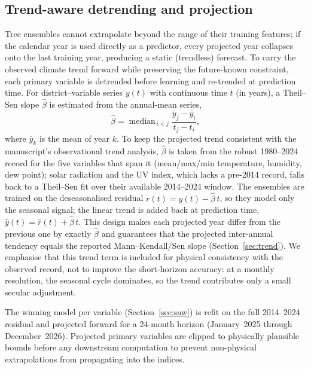 \documentclass[review,11pt]{elsarticle}
\begin{document}
\subsection{Trend-aware detrending and projection}\label{sec:detrend}
Tree ensembles cannot extrapolate beyond the range of their training features;
if the calendar year is used directly as a predictor, every projected year
collapses onto the last training year, producing a static (trendless) forecast.
To carry the observed climate trend forward while preserving the future-known
constraint, each primary variable is detrended before learning and re-trended at
prediction time. For district--variable series $y(t)$ with continuous time $t$
(in years), a Theil--Sen slope $\hat{\beta}$ is estimated from the
annual-mean series,
\begin{equation}
\hat{\beta}=\operatorname{median}_{\,i<j}
\frac{\bar{y}_{j}-\bar{y}_{i}}{t_{j}-t_{i}},
\label{eq:theilsen}
\end{equation}
where $\bar{y}_{k}$ is the mean of year $k$. To keep the projected trend
consistent with the manuscript's observational trend analysis, $\hat{\beta}$ is
taken from the robust 1980--2024 record for the five variables that span it
(mean/max/min temperature, humidity, dew point); solar radiation and the UV
index, which lacks a pre-2014 record, falls back to a Theil--Sen fit over their
available 2014--2024 window. The ensembles are trained on the deseasonalised
residual $r(t)=y(t)-\hat{\beta}\,t$, so they model only the seasonal signal;
the linear trend is added back at prediction time,
$\hat{y}(t)=\hat{r}(t)+\hat{\beta}\,t$. This design makes each projected year
differ from the previous one by exactly $\hat{\beta}$ and guarantees that the
projected inter-annual tendency equals the reported Mann--Kendall/Sen slope
(Section~\ref{sec:trend}). We emphasise that this trend term is included for
physical consistency with the observed record, not to improve the short-horizon
accuracy: at a monthly resolution, the seasonal cycle dominates, so the trend
contributes only a small secular adjustment.

The winning model per variable (Section~\ref{sec:saw}) is refit on the full
2014--2024 residual and projected forward for a 24-month horizon (January~2025
through December~2026). Projected primary variables are clipped to
physically plausible bounds before any downstream computation to prevent
non-physical extrapolations from propagating into the indices.
\end{document}
